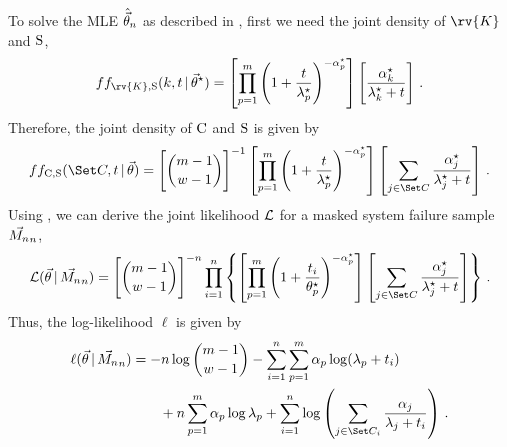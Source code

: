 \documentclass[../main.tex]{subfiles}
\begin{document}
To solve the MLE $\hat{\vec\theta}_n$ as described in , first we need the joint density of $\rv{K}$ and $\mathrm{S}$,
\begin{equation}
\pdf{f_{\rv{K}, \sv}}(k, t \given \tparam{\vec\theta}) =
    \left [
        \prod_{p=1}^{m}
        \left (
            1 + \frac{t}{\tparam{\lambda}_p}
        \right )^{-\tparam{\alpha}_p}
    \right ]
    \left [
        \frac{\tparam{\alpha}_k}{\tparam{\lambda}_k + t}
    \right ]\,.
\end{equation}
Therefore, the joint density of $\mathrm{C}$ and $\mathrm{S}$ is given by
\begin{equation}
\label{eq:par_joint_cand_density}
\pdf{f_{\rvcand, \sv}}(\cand, t \given \vec\theta) =
    \left [ {{m-1} \choose {w-1}} \right ]^{-1}
    \left [
        \prod_{p=1}^{m}
        \left (
            1 + \frac{t}{\tparam{\lambda}_p}
        \right )^{-\tparam{\alpha}_p}
    \right ]
    \left [
        \sum_{j \in \cand} \frac{\tparam{\alpha}_j}{\tparam{\lambda}_j + t}
    \right ]\,.
\end{equation}
Using , we can derive the joint likelihood $\operatorname{\mathcal{L}}$ for a masked system failure sample $\vec{M_n}_n$,
\begin{equation}
\likelihood(\vec\theta \given \mfs_n) =
    \left [ {{m-1} \choose {w-1}} \right ]^{-n}
    \prod_{i=1}^{n}
    \left \{
        \left [
            \prod_{p=1}^{m}
            \left (
                1 + \frac{t_i}{\tparam{\theta}_p}
            \right )^{-\tparam{\alpha}_p}
        \right ]
        \left [
            \sum_{j \in \cand} \frac{\tparam{\alpha}_j}{\tparam{\lambda}_j + t}
        \right ]
    \right \}\,.
\end{equation}
Thus, the log-likelihood $\ell$ is given by
\begin{equation}
\begin{split}
    \ell(\vec{\theta} \given \mfs_n) &=
        -n \log {{m-1} \choose {w-1}}
        -\sum_{i=1}^{n} \sum_{p=1}^{m} \alpha_p \log(\lambda_p + t_i)\\
        &\qquad + n \sum_{p=1}^{m} \alpha_p \log \lambda_p
        + \sum_{i=1}^{n} \log \left ( \sum_{j \in \cand_i}
        \frac{\alpha_j}{\lambda_j + t_i} \right )\,.
\end{split}
\end{equation}
\end{document}
